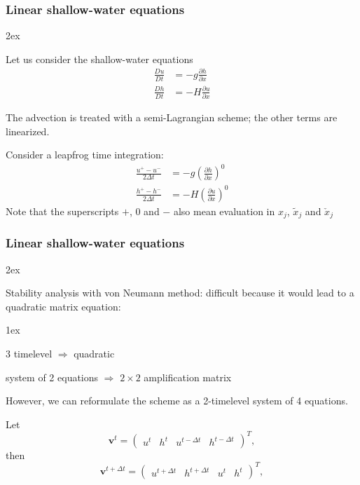 \documentclass[aspectratio=149,9pt]{beamer}
\begin{document}
%
\begin{frame}
	\frametitle{Linear shallow-water equations}
	\begin{myitemize}{2ex}
		\item Let us consider the shallow-water equations
			\begin{align*}
				\frac{D u}{D t} &= -g \frac{\partial h}{\partial x} \\
				\frac{D h}{D t} &= - H \frac{\partial u}{\partial x}
			\end{align*}
		\item The advection is treated with a semi-Lagrangian scheme; the other terms are linearized.
		\item Consider a leapfrog time integration:
			\begin{align*}
				\frac{u^+ - u^-}{2 \Delta t} &= -g \left(
				\frac{\partial h}{\partial x}
				\right)^0
				\\
				\frac{h^+-h^-}{2 \Delta t} &= - H
				\left(
				\frac{\partial u}{\partial x}
				\right)^0 
			\end{align*}
			Note that the superscripts $+$, $0$ and $-$ also mean evaluation in $x_j$, $\tilde x_j$ and $\check x_j$
	\end{myitemize}
\end{frame}
%
%
\begin{frame}
	\frametitle{Linear shallow-water equations}
	\begin{myitemize}{2ex}
		\item Stability analysis with von Neumann method: difficult because it would lead to a quadratic matrix equation:
			\begin{myitemize}{1ex}
				\item 3 timelevel $\Rightarrow$ quadratic
				\item system of 2 equations $\Rightarrow$ $2\times 2$ amplification matrix
			\end{myitemize}
		\item However, we can reformulate the scheme as a 2-timelevel system of 4 equations.
			\par\vspace*{2ex}
			Let
			\begin{equation*}
				\bm v^t=\left(\begin{array}{cccc}u^t & h^t & u^{t-\Delta t} & h^{t-\Delta t}\end{array}\right)^T,
			\end{equation*}
			then
			\begin{equation*}
				\bm v^{t+\Delta t}=\left(\begin{array}{cccc}u^{t+\Delta t} & h^{t +\Delta t} & u^{t} & h^{t}\end{array}\right)^T,
			\end{equation*}
	\end{myitemize}
\end{frame}
\end{document}
